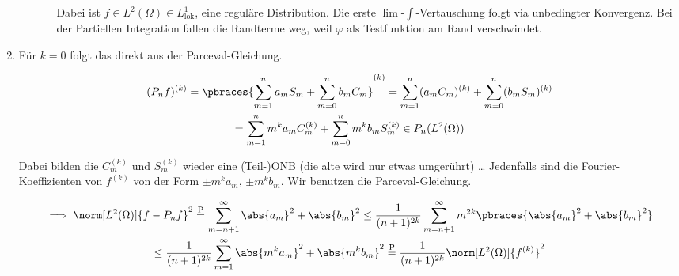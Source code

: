 \begin{solution}
\begin{enumerate}[label = (\roman*)]
\begin{enumerate}
\begin{itemize}
      Dabei ist $f \in L^2(\Omega) \in L^1_\mathrm{lok}$, eine reguläre Distribution.
      Die erste $\lim$-$\int$-Vertauschung folgt via unbedingter Konvergenz.
      Bei der Partiellen Integration fallen die Randterme weg, weil $\varphi$ als Testfunktion am Rand verschwindet.

    \end{itemize}

  \end{enumerate}

  \item Für $k = 0$ folgt das direkt aus der Parceval-Gleichung.

  \begin{multline*}
    (P_n f)^{(k)}
    =
    \pbraces
    {
      \sum_{m=1}^n a_m S_m
      +
      \sum_{m=0}^n b_m C_m
    }^{(k)}
    =
    \sum_{m=1}^n (a_m C_m)^{(k)}
    +
    \sum_{m=0}^n (b_m S_m)^{(k)} \\
    =
    \sum_{m=1}^n m^k a_m C_m^{(k)}
    +
    \sum_{m=0}^n m^k b_m S_m^{(k)}
    \in
    P_n(L^2(\Omega))
  \end{multline*}

  Dabei bilden die $C_m^{(k)}$ und $S_m^{(k)}$ wieder eine (Teil-)ONB (die alte wird nur etwas umgerührt) \dots
  Jedenfalls sind die Fourier-Koeffizienten von $f^{(k)}$ von der Form $\pm m^k a_m$, $\pm m^k b_m$.
  Wir benutzen die Parceval-Gleichung.

  \begin{multline*}
    \implies
    \norm[L^2(\Omega)]{f - P_n f}^2
    \stackrel
    {
      \mathrm{P}
    }{=}
    \sum_{m=n+1}^\infty \abs{a_m}^2 + \abs{b_m}^2
    \leq
    \frac{1}{(n + 1)^{2k}}
    \sum_{m=n+1}^\infty m^{2k} \pbraces{\abs{a_m}^2 + \abs{b_m}^2} \\
    \leq
    \frac{1}{(n + 1)^{2k}}
    \sum_{m=1}^\infty \abs{m^k a_m}^2 + \abs{m^k b_m}^2
    \stackrel
    {
      \mathrm{P}
    }{=}
    \frac{1}{(n + 1)^{2k}}
    \norm[L^2(\Omega)]{f^{(k)}}^2
  \end{multline*}

\end{enumerate}

\end{solution}

